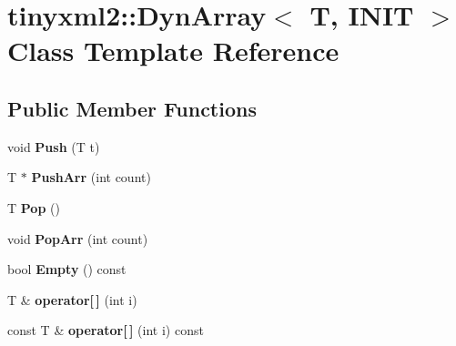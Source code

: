 \hypertarget{classtinyxml2_1_1_dyn_array}{}\section{tinyxml2\+:\+:Dyn\+Array$<$ T, I\+N\+IT $>$ Class Template Reference}
\label{classtinyxml2_1_1_dyn_array}
\subsection*{Public Member Functions}
\begin{DoxyCompactItemize}
\item 
void {\bfseries Push} (T t)\hypertarget{classtinyxml2_1_1_dyn_array_a498de53808ba0151fef54ea10bf51050}{}\label{classtinyxml2_1_1_dyn_array_a498de53808ba0151fef54ea10bf51050}

\item 
T $\ast$ {\bfseries Push\+Arr} (int count)\hypertarget{classtinyxml2_1_1_dyn_array_aa3c360d40addc3b05121da9f60a01b4d}{}\label{classtinyxml2_1_1_dyn_array_aa3c360d40addc3b05121da9f60a01b4d}

\item 
T {\bfseries Pop} ()\hypertarget{classtinyxml2_1_1_dyn_array_a2281e3342bc235bf391a67e362c75866}{}\label{classtinyxml2_1_1_dyn_array_a2281e3342bc235bf391a67e362c75866}

\item 
void {\bfseries Pop\+Arr} (int count)\hypertarget{classtinyxml2_1_1_dyn_array_ab45c0836d8c0260a5b9eda7da80de71c}{}\label{classtinyxml2_1_1_dyn_array_ab45c0836d8c0260a5b9eda7da80de71c}

\item 
bool {\bfseries Empty} () const \hypertarget{classtinyxml2_1_1_dyn_array_a080dc4dc68713964bb17745d4c833158}{}\label{classtinyxml2_1_1_dyn_array_a080dc4dc68713964bb17745d4c833158}

\item 
T \& {\bfseries operator\mbox{[}$\,$\mbox{]}} (int i)\hypertarget{classtinyxml2_1_1_dyn_array_a775a6ab4d41f0eb15bdd863d408dd58f}{}\label{classtinyxml2_1_1_dyn_array_a775a6ab4d41f0eb15bdd863d408dd58f}

\item 
const T \& {\bfseries operator\mbox{[}$\,$\mbox{]}} (int i) const \hypertarget{classtinyxml2_1_1_dyn_array_a1f4874c2608cbd68be1627fca9efd820}{}\label{classtinyxml2_1_1_dyn_array_a1f4874c2608cbd68be1627fca9efd820}


\end{DoxyCompactItemize}
